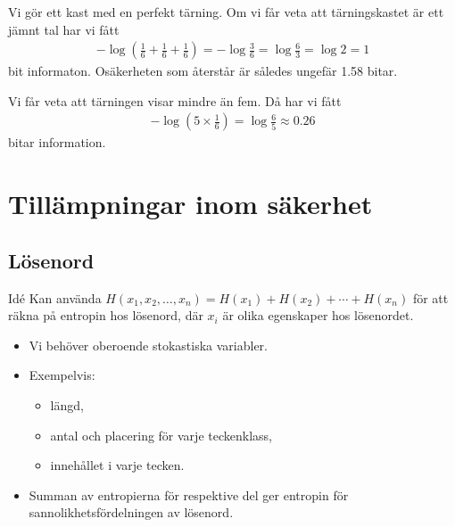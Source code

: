 \documentclass{beamer}
\theoremstyle{definition}
\begin{document}
\begin{frame}{\insertsubsectionhead}
  \begin{example}
    Vi gör ett kast med en perfekt tärning.
    Om vi får veta att tärningskastet är ett jämnt tal har vi fått
    \begin{align*}
      -\log\left( \frac{1}{6} + \frac{1}{6} + \frac{1}{6}\right) =
      -\log\frac{3}{6} = \log\frac{6}{3} = \log 2 = 1
    \end{align*}
    bit informaton.
    Osäkerheten som återstår är således ungefär 1.58 bitar.
  \end{example}
\end{frame}

\begin{frame}{\insertsubsectionhead}
  \begin{example}
    Vi får veta att tärningen visar mindre än fem.
    Då har vi fått
    \begin{align*}
      -\log\left( 5\times\frac{1}{6}\right) = \log\frac{6}{5}\approx 0.26
    \end{align*}
    bitar information.
  \end{example}
\end{frame}


\section[Tillämpningar]{Tillämpningar inom säkerhet}

\subsection{Lösenord}

\begin{frame}{\insertsubsectionhead}
  \begin{block}{Idé}
    Kan använda \(H(x_1, x_2, \ldots, x_n) = H(x_1) + H(x_2) + \cdots 
    + H(x_n)\) för att räkna på entropin hos lösenord, där \(x_i\) är olika 
    egenskaper hos lösenordet.
  \end{block}

  \begin{example}
    \begin{itemize}
      \item Vi behöver oberoende stokastiska variabler.

      \item Exempelvis:
        \begin{itemize}
          \item längd,
          \item antal och placering för varje teckenklass,
          \item innehållet i varje tecken.
        \end{itemize}

      \item Summan av entropierna för respektive del ger entropin för 
        sannolikhetsfördelningen av lösenord.

    \end{itemize}
  \end{example}

\end{frame}
\end{document}
